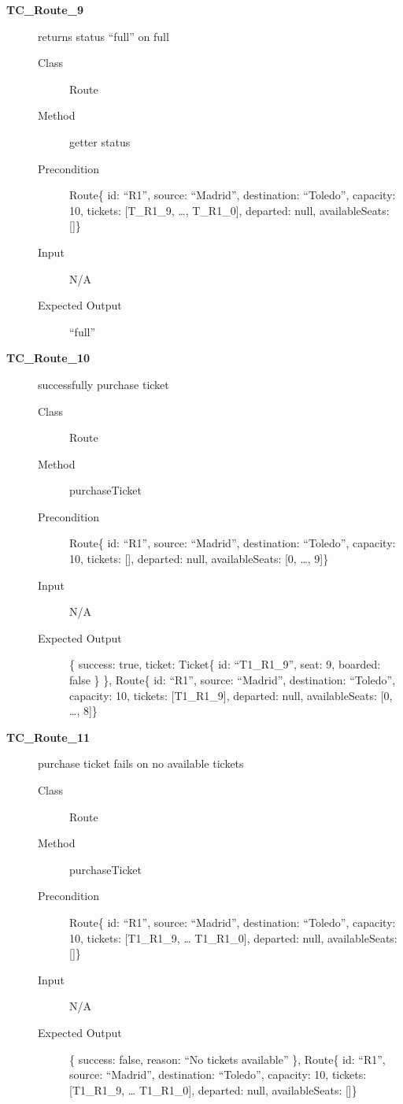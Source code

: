 \documentclass[11pt]{article}
\begin{document}
\begin{description}
\item[{\textbf{TC\_Route\_9}}] returns status “full” on full
\begin{description}
\item[{Class}] Route
\item[{Method}] getter status
\item[{Precondition}] Route\{ id: “R1”, source: “Madrid”, destination: “Toledo”, capacity: 10,  tickets: [T\_R1\_9, …, T\_R1\_0], departed: null, availableSeats: []\}
\item[{Input}] N/A
\item[{Expected Output}] “full”
\end{description}

\item[{\textbf{TC\_Route\_10}}] successfully purchase ticket
\begin{description}
\item[{Class}] Route
\item[{Method}] purchaseTicket
\item[{Precondition}] Route\{ id: “R1”, source: “Madrid”, destination: “Toledo”, capacity: 10,  tickets: [], departed: null, availableSeats: [0, …, 9]\}
\item[{Input}] N/A
\item[{Expected Output}] \{ success: true, ticket:  Ticket\{ id: “T1\_R1\_9”, seat: 9, boarded: false \} \},
Route\{ id: “R1”, source: “Madrid”, destination: “Toledo”, capacity: 10,  tickets: [T1\_R1\_9], departed: null, availableSeats: [0, …, 8]\}
\end{description}

\item[{\textbf{TC\_Route\_11}}] purchase ticket fails on no available tickets
\begin{description}
\item[{Class}] Route
\item[{Method}] purchaseTicket
\item[{Precondition}] Route\{ id: “R1”, source: “Madrid”, destination: “Toledo”, capacity: 10,  tickets: [T1\_R1\_9, … T1\_R1\_0], departed: null, availableSeats: []\}
\item[{Input}] N/A
\item[{Expected Output}] \{ success: false, reason: “No tickets available” \},
Route\{ id: “R1”, source: “Madrid”, destination: “Toledo”, capacity: 10,  tickets: [T1\_R1\_9, … T1\_R1\_0], departed: null, availableSeats: []\}
\end{description}


\end{description}
\end{document}
